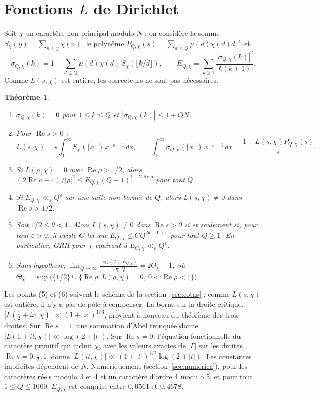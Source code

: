 \documentclass[11pt,a4paper]{amsart}
\newtheorem{teorema}{Th\'eor\`eme}
\theoremstyle{definition}
\theoremstyle{remark}
\renewcommand{\Re}{\operatorname{Re}}
\begin{document}
\section{Fonctions $L$ de Dirichlet}\label{sec:dirichlet}

Soit $\chi$ un caract\`ere non principal modulo $N$ ; on consid\`ere la somme $S_\chi(y)=\sum_{n\le y}\chi(n)$, le polyn\^ome $P_{Q,\chi}(s)=\sum_{d\le Q}\mu(d)\chi(d)d^{-s}$ et
\[
\sigma_{Q,\chi}(k)=1-\sum_{d\le Q}\mu(d)\chi(d)\,S_\chi(\lfloor k/d\rfloor),\qquad
E_{Q,\chi}=\sum_{k\ge1}\frac{|\sigma_{Q,\chi}(k)|^2}{k(k+1)}.
\]
Comme $L(s,\chi)$ est enti\`ere, les correcteurs ne sont pas n\'ecessaires.

\begin{teorema}\label{teo:dirichlet}
\begin{enumerate}
\item $\sigma_{Q,\chi}(k)=0$ pour $1\le k\le Q$ et $|\sigma_{Q,\chi}(k)|\le1+QN$.
\item Pour $\Re s>0$ :
\[
L(s,\chi)=s\int_1^\infty S_\chi(\lfloor x\rfloor)\,x^{-s-1}\,dx,\qquad
\int_1^\infty\sigma_{Q,\chi}(\lfloor x\rfloor)\,x^{-s-1}\,dx=\frac{1-L(s,\chi)P_{Q,\chi}(s)}{s}.
\]
\item Si $L(\rho,\chi)=0$ avec $\Re\rho>1/2$, alors $(2\Re\rho-1)/|\rho|^2\le E_{Q,\chi}(Q+1)^{1-2\Re\rho}$ pour tout $Q$.
\item Si $E_{Q,\chi}\ll_\varepsilon Q^\varepsilon$ sur une suite non born\'ee de $Q$, alors $L(s,\chi)\ne0$ dans $\Re s>1/2$.
\item Soit $1/2\le\theta<1$. Alors $L(s,\chi)\ne0$ dans $\Re s>\theta$ si et seulement si, pour tout $\varepsilon>0$, il existe $C$ tel que $E_{Q,\chi}\le CQ^{2\theta-1+\varepsilon}$ pour tout $Q\ge1$. En particulier, GRH pour $\chi$ \'equivaut \`a $E_{Q,\chi}\ll_\varepsilon Q^\varepsilon$.
\item Sans hypoth\`ese, $\displaystyle\lim_{Q\to\infty}\frac{\log(2+E_{Q,\chi})}{\log Q}=2\Theta_\chi-1$, o\`u $\Theta_\chi=\sup\bigl(\{1/2\}\cup\{\Re\rho:L(\rho,\chi)=0,\ 0<\Re\rho<1\}\bigr)$.
\end{enumerate}
\end{teorema}

Les points (5) et (6) suivent le sch\'ema de la section~\ref{sec:cotas} ; comme $L(s,\chi)$ est enti\`ere, il n'y a pas de p\^ole \`a compenser. La borne sur la droite critique, $|L(\tfrac12+ix,\chi)|\ll(1+|x|)^{1/3}$, provient \`a nouveau du th\'eor\`eme des trois droites. Sur $\Re s=1$, une sommation d'Abel tronqu\'ee donne $|L(1+it,\chi)|\ll\log(2+|t|)$. Sur $\Re s=0$, l'\'equation fonctionnelle du caract\`ere primitif qui induit $\chi$, avec les valeurs exactes de $|\Gamma|$ sur les droites $\Re s=0,\tfrac12,1$, donne $|L(it,\chi)|\ll(1+|t|)^{1/2}\log(2+|t|)$. Les constantes implicites d\'ependent de $N$. Num\'eriquement (section~\ref{sec:numerica}), pour les caract\`eres r\'eels modulo $3$ et $4$ et un caract\`ere d'ordre $4$ modulo $5$, et pour tout $1\le Q\le1000$, $E_{Q,\chi}$ est comprise entre $0{,}0561$ et $0{,}4678$.
\end{document}
